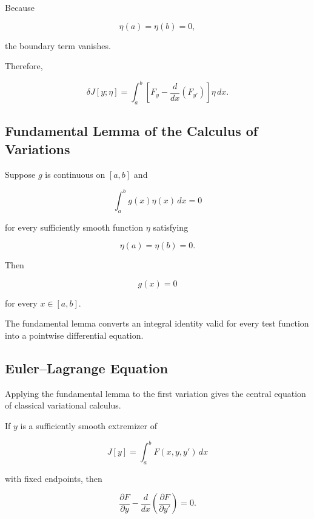 Because

\[
\eta(a)=\eta(b)=0,
\]

the boundary term vanishes.

Therefore,

\[
\boxed{
\delta J[y;\eta]
=
\int_a^b
\left[
F_y
-
\frac{d}{dx}
\left(
F_{y'}
\right)
\right]
\eta\,dx.
}
\]

\subsection{Fundamental Lemma of the Calculus of Variations}
\label{subsec:fundamental-lemma-variations}

\begin{theorem}
Suppose \(g\) is continuous on \([a,b]\) and

\[
\int_a^b
g(x)\eta(x)\,dx
=
0
\]

for every sufficiently smooth function \(\eta\) satisfying

\[
\eta(a)=\eta(b)=0.
\]

Then

\[
\boxed{
g(x)=0
}
\]

for every \(x\in[a,b]\).
\end{theorem}

The fundamental lemma converts an integral identity valid for every test
function into a pointwise differential equation.

\subsection{Euler--Lagrange Equation}
\label{subsec:euler-lagrange-equation}

Applying the fundamental lemma to the first variation gives the central
equation of classical variational calculus.

\begin{theorem}
If \(y\) is a sufficiently smooth extremizer of

\[
J[y]
=
\int_a^b
F(x,y,y')\,dx
\]

with fixed endpoints, then

\[
\boxed{
\frac{\partial F}{\partial y}
-
\frac{d}{dx}
\left(
\frac{\partial F}{\partial y'}
\right)
=
0.
}
\]
\end{theorem}

